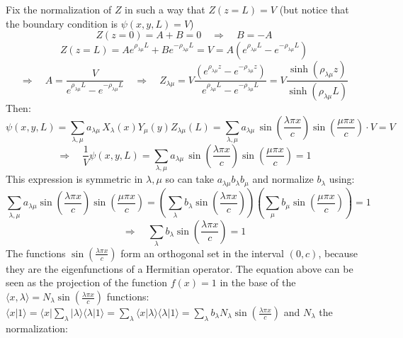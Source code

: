 \documentclass{article}
\begin{document}
\newpage

\noindent
Fix the normalization of $Z$ in such a way that $Z(z=L)=V$ (but notice that the boundary condition is $\psi(x,y,L)=V$)
\begin{equation}
    Z(z=0) = A + B = 0 \quad \Rightarrow \quad B = -A
\end{equation}
\begin{equation}
    Z(z=L) = A e^{\rho_{\lambda\mu} L} + B e^{-\rho_{\lambda\mu} L}
= V= A \left( e^{\rho_{\lambda\mu} L} - e^{-\rho_{\lambda\mu} L} \right)
\end{equation}
\begin{equation}
    \Rightarrow \quad
A = \frac{V}{e^{\rho_{\lambda\mu} L} - e^{-\rho_{\lambda\mu} L}}
\quad \Rightarrow \quad
Z_{\lambda\mu} = V\frac{\left( e^{\rho_{\lambda\mu} z} - e^{-\rho_{\lambda\mu} z} \right)}{e^{\rho_{\lambda\mu} L} - e^{-\rho_{\lambda\mu} L}} = V \frac{\sinh\left( \rho_{\lambda\mu} z \right)}{\sinh\left( \rho_{\lambda\mu} L \right)}
\end{equation}
Then:
\begin{equation}
    \psi(x, y, L)
= \sum_{\lambda, \mu} a_{\lambda \mu} \, X_\lambda(x) Y_\mu(y) Z_{\lambda \mu}(L)
= \sum_{\lambda, \mu} a_{\lambda \mu} \, \sin\left( \frac{\lambda \pi x}{c} \right)
\sin\left( \frac{\mu \pi x}{c} \right) \cdot V = V
\end{equation}
\begin{equation}
    \Rightarrow \quad
\frac{1}{V} \psi(x, y, L)
= \sum_{\lambda, \mu} a_{\lambda \mu} \, \sin\left( \frac{\lambda \pi x}{c} \right)
\sin\left( \frac{\mu \pi x}{c} \right)
= 1
\end{equation}
This expression is symmetric in $\lambda, \mu$ so can take $a_{\lambda \mu} b_\lambda b_\mu $ and normalize $b_\lambda$ using:
\begin{equation}
    \sum_{\lambda, \mu} a_{\lambda \mu}
\sin\left( \frac{\lambda \pi x}{c} \right)
\sin\left( \frac{\mu \pi x}{c} \right)
=
\left( \sum_{\lambda} b_\lambda \sin\left( \frac{\lambda \pi x}{c} \right) \right)
\left( \sum_{\mu} b_\mu \sin\left( \frac{\mu \pi x}{c} \right) \right)
= 1
\end{equation}
\begin{equation}
    \Rightarrow \quad
\sum_{\lambda} b_\lambda \sin\left( \frac{\lambda \pi x}{c} \right) = 1
\end{equation}
The functions $\sin\left( \frac{\lambda \pi x}{c} \right)$ form an orthogonal set in the interval $(0, c)$, because they are the eigenfunctions of a Hermitian operator. The equation above can be seen as the projection of the function $f(x) = 1$ in the base of the $\langle x, \lambda \rangle = N_\lambda \sin\left( \frac{\lambda \pi x}{c} \right)$ functions: $\langle x | 1 \rangle = \langle x | \sum_\lambda | \lambda \rangle \langle \lambda | 1 \rangle = \sum_\lambda \langle x | \lambda \rangle \langle \lambda | 1 \rangle = \sum_\lambda b_\lambda N_\lambda \sin\left( \frac{\lambda \pi x}{c} \right)$ and $N_\lambda$ the normalization:
\end{document}
